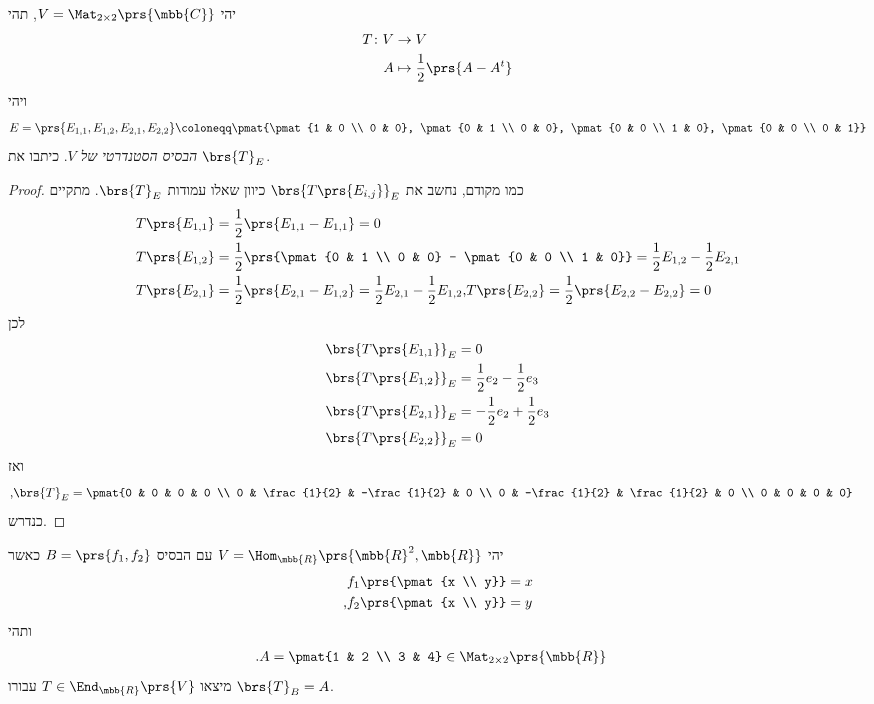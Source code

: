 \documentclass[a4paper,10pt,twoside,openany]{book}
\begin{document}
\begin{exercisechap}
יהי
$V = \Mat_{2 \times 2}\prs{\mbb{C}}$,
תהי
\begin{align*}
T \colon V &\to V \\
A &\mapsto \frac{1}{2} \prs{A - A^t}
\end{align*}
ויהי
\[E = \prs{E_{1,1}, E_{1,2}, E_{2,1}, E_{2,2}} \coloneqq \pmat{\pmat{1 & 0 \\ 0 & 0}, \pmat{0 & 1 \\ 0 & 0}, \pmat{0 & 0 \\ 1 & 0}, \pmat{0 & 0 \\ 0 & 1}}\]
\emph{הבסיס הסטנדרטי של
$V$}.
כיתבו את
$\brs{T}_E$.
\end{exercisechap}

\begin{proof}
כמו מקודם, נחשב את
$\brs{T\prs{E_{i,j}}}_E$
כיוון שאלו עמודות
$\brs{T}_E$.
מתקיים
\begin{align*}
T\prs{E_{1,1}} &= \frac{1}{2} \prs{E_{1,1} - E_{1,1}} = 0 \\
T\prs{E_{1,2}} &= \frac{1}{2} \prs{\pmat{0 & 1 \\ 0 & 0} - \pmat{0 & 0 \\ 1 & 0}} = \frac{1}{2} E_{1,2} - \frac{1}{2} E_{2,1} \\
T\prs{E_{2,1}} &= \frac{1}{2} \prs{E_{2,1} - E_{1,2}} = \frac{1}{2} E_{2,1} - \frac{1}{2} E_{1,2}
\text{,} T\prs{E_{2,2}} = \frac{1}{2} \prs{E_{2,2} - E_{2,2}} = 0 \\
\end{align*}
לכן
\begin{align*}
\brs{T\prs{E_{1,1}}}_E &= 0 \\
\brs{T\prs{E_{1,2}}}_E &= \frac{1}{2} e_2 - \frac{1}{2} e_3 \\
\brs{T\prs{E_{2,1}}}_E &= -\frac{1}{2} e_2 + \frac{1}{2} e_3 \\
\brs{T\prs{E_{2,2}}}_E &= 0
\end{align*}
ואז
\begin{align*}
\text{,} \brs{T}_E &= \pmat{0 & 0 & 0 & 0 \\ 0 & \frac{1}{2} & -\frac{1}{2} & 0 \\ 0 & -\frac{1}{2} & \frac{1}{2} & 0 \\ 0 & 0 & 0 & 0}
\end{align*}
כנדרש.
\end{proof}

\begin{exercisechap}
יהי
$V = \Hom_{\mbb{R}}\prs{\mbb{R}^2, \mbb{R}}$
עם הבסיס
$B = \prs{f_1, f_2}$
כאשר
\begin{align*}
f_1\prs{\pmat{x \\ y}} &= x \\
\text{,} f_2\prs{\pmat{x \\ y}} &= y
\end{align*}
ותהי
\begin{align*}
\text{.} A &= \pmat{1 & 2 \\ 3 & 4} \in \Mat_{2 \times 2}\prs{\mbb{R}}
\end{align*}
מיצאו
$T \in \End_{\mbb{R}}\prs{V}$
עבורו
$\brs{T}_B = A$.
\end{exercisechap}
\end{document}
